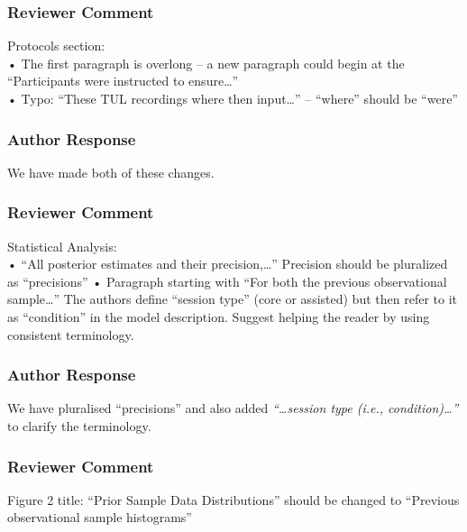 \documentclass[
  letterpaper,
  DIV=11,
  numbers=noendperiod]{scrartcl}
\begin{document}
\hypertarget{reviewer-comment-9}{%
\subsubsection{Reviewer Comment}\label{reviewer-comment-9}}

Protocols section:\\
• The first paragraph is overlong -- a new paragraph could begin at the
``Participants were instructed to ensure\ldots{}''\\
• Typo: ``These TUL recordings where then input\ldots{}'' -- ``where''
should be ``were''

\hypertarget{author-response-9}{%
\subsubsection{Author Response}\label{author-response-9}}

We have made both of these changes.

\hypertarget{reviewer-comment-10}{%
\subsubsection{Reviewer Comment}\label{reviewer-comment-10}}

Statistical Analysis:\\
• ``All posterior estimates and their precision,\ldots{}'' Precision
should be pluralized as ``precisions'' • Paragraph starting with ``For
both the previous observational sample\ldots{}'' The authors define
``session type'' (core or assisted) but then refer to it as
``condition'' in the model description. Suggest helping the reader by
using consistent terminology.

\hypertarget{author-response-10}{%
\subsubsection{Author Response}\label{author-response-10}}

We have pluralised ``precisions'' and also added \emph{``\ldots session
type (i.e., condition)\ldots{}''} to clarify the terminology.

\hypertarget{reviewer-comment-11}{%
\subsubsection{Reviewer Comment}\label{reviewer-comment-11}}

Figure 2 title: ``Prior Sample Data Distributions'' should be changed to
``Previous observational sample histograms''
\end{document}
